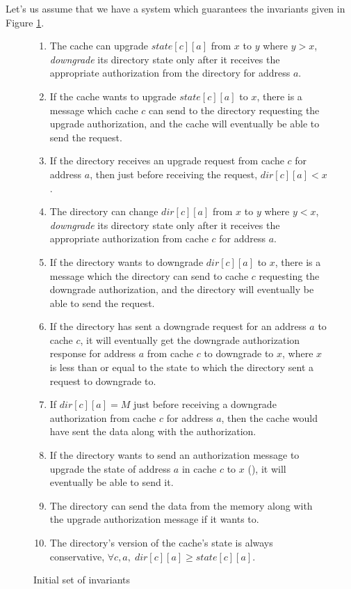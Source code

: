 Let's us assume that we have a system which guarantees the invariants given
in Figure \ref{FirstInv}.

\begin{figure}
\begin{enumerate}
\item The cache can upgrade $state[c][a]$ from $x$ to $y$ where $y > x$, \ie
\emph{downgrade} its directory state only after it receives the appropriate
authorization from the directory for address $a$. \label{cwaitresp}
\item If the cache wants to upgrade $state[c][a]$ to $x$, there is a
message  which cache $c$ can send to the directory requesting
the upgrade authorization, and the cache will eventually be able to send
the request. \label{csendreq}
\item If the directory receives an upgrade request  from cache
$c$ for address $a$, then just before receiving the request, $dir[c][a] < x$.
\label{drecvreq}
\item The directory can change $dir[c][a]$ from $x$ to $y$ where $y < x$, \ie
\emph{downgrade} its directory state only after it receives the appropriate
authorization from cache $c$ for address $a$. \label{dwaitresp}
\item If the directory wants to downgrade $dir[c][a]$ to $x$, there is a
message  which the directory can send to cache $c$ requesting
the downgrade authorization, and the directory will eventually be able to send
the request. \label{dsendreq}
\item If the directory has sent a downgrade request for an address $a$ to cache
$c$, it will eventually get the downgrade authorization response for address $a$
from cache $c$ to downgrade to $x$, where $x$ is less than or equal to the state
to which the directory sent a request to downgrade to. \label{drecvresp}
\item If $dir[c][a] = M$ just before receiving a downgrade authorization from
cache $c$ for address $a$, then the cache would have sent the data along with
the authorization. \label{drecvdata}
\item If the directory wants to send an authorization message to upgrade the
state of address $a$ in cache $c$ to $x$ (), it will
eventually be able to send it. \label{dsendresp}
\item The directory can send the data from the memory along with the upgrade
authorization message if it wants to. \label{dsenddata}
\item The directory's version of the cache's state is always conservative, \ie
$\forall c, a,\; dir[c][a] \ge state[c][a]$. \label{conservative}
\end{enumerate}
\caption{Initial set of invariants \FirstInv}
\label{FirstInv}
\end{figure}

